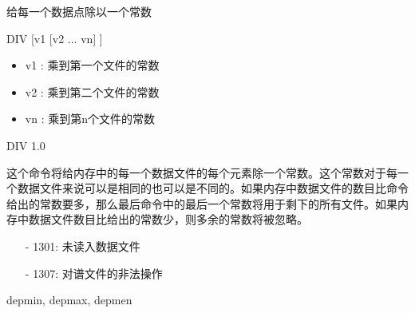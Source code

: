 \label{cmd:div}

给每一个数据点除以一个常数

\begin{SACSTX}
DIV [v1 [v2 ... vn] ]
\end{SACSTX}

\begin{itemize}
\item v1 : 乘到第一个文件的常数
\item v2 : 乘到第二个文件的常数
\item vn : 乘到第n个文件的常数 
\end{itemize}

\begin{SACDFT}
DIV 1.0
\end{SACDFT}

这个命令将给内存中的每一个数据文件的每个元素除一个常数。这个常数对于每一个数据文件来说可以是相同的也可以是不同的。如果内存中数据文件的数目比命令给出的常数要多，那么最后命令中的最后一个常数将用于剩下的所有文件。如果内存中数据文件数目比给出的常数少，则多余的常数将被忽略。

\begin{itemize}
\item[-]1301: 未读入数据文件
\item[-]1307: 对谱文件的非法操作
\end{itemize}

depmin, depmax, depmen
